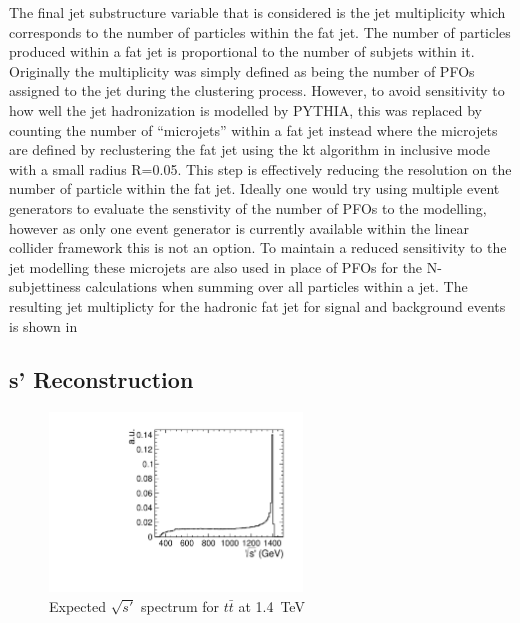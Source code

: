 The final jet substructure variable that is considered is the jet multiplicity which corresponds to the number of particles within the fat jet. The number of particles produced within a fat jet is proportional to the number of subjets within it. Originally the multiplicity was simply defined as being the number of \ac{PFO}s assigned to the jet during the clustering process. However, to avoid sensitivity to how well the jet hadronization is modelled by PYTHIA, this was replaced by counting the number of ``microjets'' within a fat jet instead where the microjets are defined by reclustering the fat jet using the kt algorithm in inclusive mode with a small radius R=0.05. This step is effectively reducing the resolution on the number of particle within the fat jet. Ideally one would try using multiple event generators to evaluate the senstivity of the number of PFOs to the modelling, however as only one event generator is currently available within the linear collider framework this is not an option. To maintain a reduced sensitivity to the jet modelling these microjets are also used in place of PFOs for the N-subjettiness calculations when summing over all particles within a jet. The resulting jet multiplicty for the hadronic fat jet for signal and background events is shown in 



\subsection{s' Reconstruction}
\label{sec:sprime}
\begin{figure}
  \centering
  \includegraphics[width=0.6\textwidth]{TopAnalysis/figures/GeneratorSPrime.pdf}
  \caption[Expected $\sqrt{s'}$ spectrum for $t\bar{t}$ at 1.4~TeV]{Expected $\sqrt{s'}$ spectrum for $t\bar{t}$ at 1.4~TeV}
  \label{fig:trueSPrime}
\end{figure}

